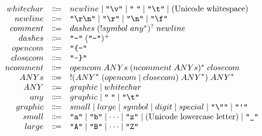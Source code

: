\begin{align*}
  \begin{array}{rcl}
    {whitechar}
    & \Coloneq & {newline}
    \mid \text{\texttt{\textquotedbl\textbackslash v\textquotedbl}}
    \mid \text{\texttt{\textquotedbl\;\textquotedbl}}
    \mid \text{\texttt{\textquotedbl\textbackslash t\textquotedbl}}
    \mid (\text{Unicode whitespace})
    \\
    {newline}
    & \Coloneq & \text{\texttt{\textquotedbl\textbackslash r\textbackslash n\textquotedbl}}
    \mid \text{\texttt{\textquotedbl\textbackslash r\textquotedbl}}
    \mid \text{\texttt{\textquotedbl\textbackslash n\textquotedbl}}
    \mid \text{\texttt{\textquotedbl\textbackslash f\textquotedbl}}
    \\
    {comment}
    & \Coloneq & {dashes}\; (! {symbol}\; {any}^*)^?\; {newline}
    \\
    {dashes}
    & \Coloneq & \text{\texttt{\textquotedbl-\textquotedbl}}\; (\text{\texttt{\textquotedbl-\textquotedbl}})^+
    \\
    {opencom}
    & \Coloneq & \text{\texttt{\textquotedbl\{-\textquotedbl}}
    \\
    {closecom}
    & \Coloneq & \text{\texttt{\textquotedbl-\}\textquotedbl}}
    \\
    {ncomment}
    & \Coloneq & {opencom}\; {ANYs}\; ({ncomment}\; {ANYs})^*\; {closecom}
    \\
    {ANYs}
    & \Coloneq & ! ({ANY}^*\; ({opencom} \mid {closecom})\; {ANY}^*)\; {ANY}^*
    \\
    {ANY}
    & \Coloneq & {graphic}
    \mid {whitechar}
    \\
    {any}
    & \Coloneq & {graphic}
    \mid \text{\texttt{\textquotedbl\;\textquotedbl}}
    \mid \text{\texttt{\textquotedbl\textbackslash t\textquotedbl}}
    \\
    {graphic}
    & \Coloneq & {small}
    \mid {large}
    \mid {symbol}
    \mid {digit}
    \mid {special}
    \mid \text{\texttt{\textquotedbl\textbackslash\textquotedbl\textquotedbl}}
    \mid \text{\texttt{\textquotedbl\textquotesingle\textquotedbl}}
    \\
    {small}
    & \Coloneq & \text{\texttt{\textquotedbl a\textquotedbl}} \mid \text{\texttt{\textquotedbl b\textquotedbl}} \mid \cdots \mid \text{\texttt{\textquotedbl z\textquotedbl}}
    \mid (\text{Unicode lowercase letter})
    \mid \text{\texttt{\textquotedbl\textunderscore\textquotedbl}}
    \\
    {large}
    & \Coloneq & \text{\texttt{\textquotedbl A\textquotedbl}} \mid \text{\texttt{\textquotedbl B\textquotedbl}} \mid \cdots \mid \text{\texttt{\textquotedbl Z\textquotedbl}}

\end{array}
\end{align*}
